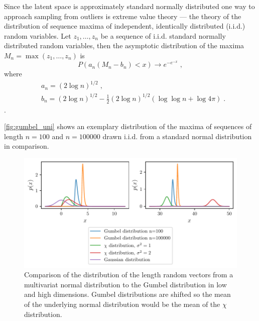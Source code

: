 Since the latent space is approximately standard normally distributed one way
to approach sampling from outliers is extreme value theory --- the theory of
the distribution of sequence maxima of independent, identically distributed
(i.i.d.) random variables. Let $z_1, \dots, z_n$ be a sequence of i.i.d.
standard normally distributed random variables, then the asymptotic distribution
of the maxima $M_n = \max (z_1, \dots, z_n)$ is
\begin{equation}%
	\label{eq:gumbel_distribution}
	P(a_n ( M_n - b_n ) < x) \rightarrow e^{-e^{-x}}\;,
\end{equation}
where
\begin{equation}
	\begin{aligned}%
		\label{eq:gumbel_params}
		 & a_n = (2 \log n )^{1/2}\;,                                         \\
		 & b_n = (2 \log n )^{1/2} - \frac{1}{2} (2 \log n )^{1/2} (\log \log
		n + \log 4 \pi)\;.
	\end{aligned}
\end{equation}
\citep{leadbetterAsymptoticDistributionsExtremes1983}.

\autoref{fig:gumbel_uni} shows an exemplary distribution of the maxima of
sequences of length $n = 100$ and $n = 100000$ drawn i.i.d. from a standard
normal distribution in comparison.
\begin{figure}[htpb]
	\centering
        \includegraphics{figures/samples/gumbel_multi.pdf}
	\caption{Comparison of the distribution of the length random vectors
		from a multivariat normal distribution to the Gumbel distribution in
		low and high dimensions. Gumbel distributions are shifted so
            the mean of the underlying normal distribution would be the mean of
        the $\chi$ distribution.}%
	\label{fig:gumbel_multi}
\end{figure}

